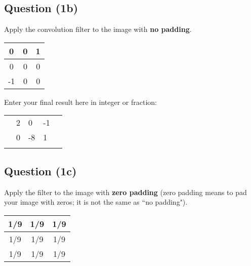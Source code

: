 \documentclass[12pt]{article}
\begin{document}
\subsection*{Question (1b)} Apply the convolution filter to the image with \textbf{no padding}.
\begin{center}
\begin{tabular}{|c|c|c|}
\hline
0  & 0 & 1 \\ \hline
0  & 0 & 0 \\ \hline
-1 & 0 & 0 \\ \hline
\end{tabular}
\end{center}

\noindent Enter your final result here in integer or fraction:

\begin{center}
\begin{tabular}{|l|l|l|l|l|}
\hline
\hspace{1mm} & \hspace{1mm} & \hspace{1mm} & \hspace{1mm} & \hspace{1mm} \\ \hline
\hspace{1mm} & 2 & 0 & -1 & \hspace{1mm} \\ \hline
\hspace{1mm} & 0 & -8 & 1 & \hspace{1mm} \\ \hline
\hspace{1mm} & \hspace{1mm} & \hspace{1mm} & \hspace{1mm} & \hspace{1mm} \\ \hline
\end{tabular}
\end{center}

\newpage

\subsection*{Question (1c)} Apply the filter to the image with \textbf{zero padding} (zero padding means to pad your image with zeros; it is not the same as ``no padding").
\begin{center}
\begin{tabular}{|c|c|c|}
\hline
1/9  & 1/9 & 1/9 \\ \hline
1/9  & 1/9 & 1/9 \\ \hline
1/9  & 1/9 & 1/9 \\ \hline
\end{tabular}
\end{center}
\end{document}
